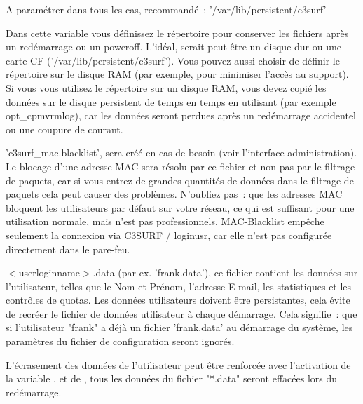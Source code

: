 \begin{itemize}
\begin{description}

  A paramétrer dans tous les cas, recommandé~: '/var/lib/persistent/c3surf'

  Dans cette variable vous définissez le répertoire pour conserver les fichiers après
  un redémarrage ou un poweroff. L'idéal, serait peut être un disque dur ou une carte CF
  ('/var/lib/persistent/c3surf'). Vous pouvez aussi choisir de définir le répertoire sur
  le disque RAM (par exemple, pour minimiser l'accès au support). Si vous vous utilisez
  le répertoire sur un disque RAM, vous devez copié les données sur le disque persistent
  de temps en temps en utilisant (par exemple opt\_cpmvrmlog), car les données seront
  perdues après un redémarrage accidentel ou une coupure de courant.

\newpage

  'c3surf\_mac.blacklist', sera créé en cas de besoin (voir l'interface
  administration). Le blocage d'une adresse MAC sera résolu par ce fichier
  et non pas par le filtrage de paquets, car si vous entrez de grandes quantités
  de données dans le filtrage de paquets cela peut causer des problèmes. N'oubliez
  pas~: que les adresses MAC bloquent les utilisateurs par défaut sur votre réseau,
  ce qui est suffisant pour une utilisation normale, mais n'est pas professionnels.
  MAC-Blacklist empêche seulement la connexion via C3SURF / loginusr, car elle n'est
  pas configurée directement dans le pare-feu.


  $<$userloginname$>$.data (par ex. 'frank.data'), ce fichier contient les données
  sur l'utilisateur, telles que le Nom et Prénom, l'adresse E-mail, les statistiques et
  les contrôles de quotas. Les données utilisateurs doivent être persistantes, cela évite
  de recréer le fichier de données utilisateur à chaque démarrage. Cela signifie~: que si
  l'utilisateur "frank" a déjà un fichier 'frank.data' au démarrage du système, les paramètres
  du fichier de configuration seront ignorés.
\parskip 12pt

  L'écrasement des données de l'utilisateur peut être renforcée avec l'activation de
  la variable .
  et de ,
  tous les données du fichier "*.data"  seront effacées lors du redémarrage.


\end{description}
\end{itemize}
